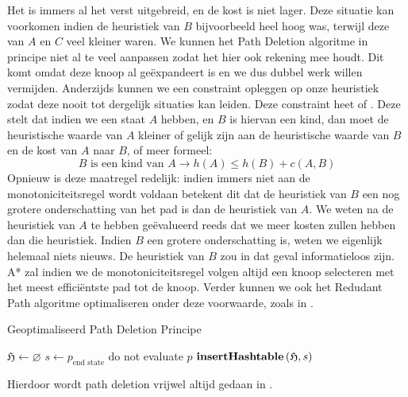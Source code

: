 Het is immers al het verst uitgebreid, en de kost is niet lager. Deze situatie kan voorkomen indien de heuristiek van $B$ bijvoorbeeld heel hoog was, terwijl deze van $A$ en $C$ veel kleiner waren. We kunnen het Path Deletion algoritme in principe niet al te veel aanpassen zodat het hier ook rekening mee houdt. Dit komt omdat deze knoop al geëxpandeert is en we dus dubbel werk willen vermijden. Anderzijds kunnen we een constraint opleggen op onze heuristiek zodat deze nooit tot dergelijk situaties kan leiden. Deze constraint heet  of . Deze stelt dat indien we een staat $A$ hebben, en $B$ is hiervan een kind, dan moet de heuristische waarde van $A$ kleiner of gelijk zijn aan de heuristische waarde van $B$ en de kost van $A$ naar $B$, of meer formeel:
\begin{equation}
B\mbox{ is een kind van }A\rightarrow h\left(A\right)\leq h\left(B\right)+c\left(A,B\right)
\end{equation}
Opnieuw is deze maatregel redelijk: indien immers niet aan de monotoniciteitsregel wordt voldaan betekent dit dat de heuristiek van $B$ een nog grotere onderschatting van het pad is dan de heuristiek van $A$. We weten na de heuristiek van $A$ te hebben geëvalueerd reeds dat we meer kosten zullen hebben dan die heuristiek. Indien $B$ een grotere onderschatting is, weten we eigenlijk helemaal niets nieuws. De heuristiek van $B$ zou in dat geval informatieloos zijn. A* zal indien we de monotoniciteitsregel volgen altijd een knoop selecteren met het meest efficiëntste pad tot de knoop. Verder kunnen we ook het Redudant Path algoritme optimaliseren onder deze voorwaarde, zoals in .
\begin{algorithm}[htb]
\caption{Geoptimaliseerd Path Deletion Principe}
\label{alg:optimalPathDeletion}
\begin{algorithmic}[1]
\STATE ${\mathfrak H}\leftarrow\varnothing$
\STATE $s\leftarrow p_{\mbox{end state}}$
\STATE do not evaluate $p$
\ELSE
\STATE $\mbox{\bf insertHashtable}\left( {\mathfrak H},s \right)$
\ENDIF
\ENDIF
\end{algorithmic}
\end{algorithm}

Hierdoor wordt path deletion vrijwel altijd gedaan in .

